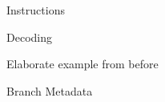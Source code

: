 \begin{frame}{Instructions}
\end{frame}

\begin{frame}{Decoding}

Elaborate example from before

\end{frame}

\begin{frame}{Branch Metadata}



\end{frame}
